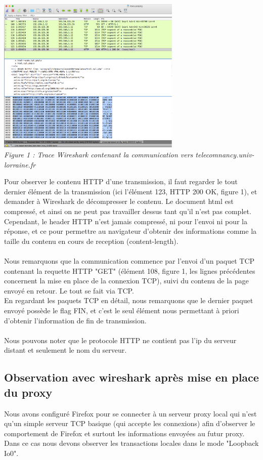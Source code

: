 \documentclass{scrreprt}
\begin{document}
\begin{center}
  \includegraphics[height=7.5cm]{images/f1.png}
  \\
  \textit{Figure 1 : Trace Wireshark contenant la communication vers telecomnancy.univ-lorraine.fr}
\end{center}


Pour observer le contenu HTTP d’une transmission, il faut regarder le tout dernier élément de la transmission (ici l'élément 123, HTTP 200 OK, figure 1), et demander à Wireshark de décompresser le contenu. Le document html est compressé, et ainsi on ne peut pas travailler dessus tant qu’il n’est pas complet. Cependant, le header HTTP n'est jamais compressé, ni pour l'envoi ni pour la réponse, et ce pour permettre au navigateur d'obtenir des informations comme la taille du contenu en cours de reception (content-length).\\\\

Nous remarquons que la communication commence par l'envoi d'un paquet TCP contenant la requette HTTP "GET" (élément 108, figure 1, les lignes précédentes concernent la mise en place de la connexion TCP), suivi du contenu de la page envoyé en retour. Le tout se fait via TCP.\\
En regardant les paquets TCP en détail, nous remarquons que le dernier paquet envoyé possède le flag FIN, et c'est le seul élément nous permettant à priori d'obtenir l'information de fin de transmission.\\\\

Nous pouvons noter que le protocole HTTP ne contient pas l'ip du serveur distant et seulement le nom du serveur.

\subsection{Observation avec wireshark après mise en place du proxy}
Nous avons configuré Firefox pour se connecter à un serveur proxy local qui n'est qu'un simple serveur TCP basique (qui accepte les connexions) afin d'observer le comportement de Firefox et surtout les informations envoyées au futur proxy.\\
Dans ce cas nous devons observer les transactions locales dans le mode "Loopback Io0".
\end{document}
